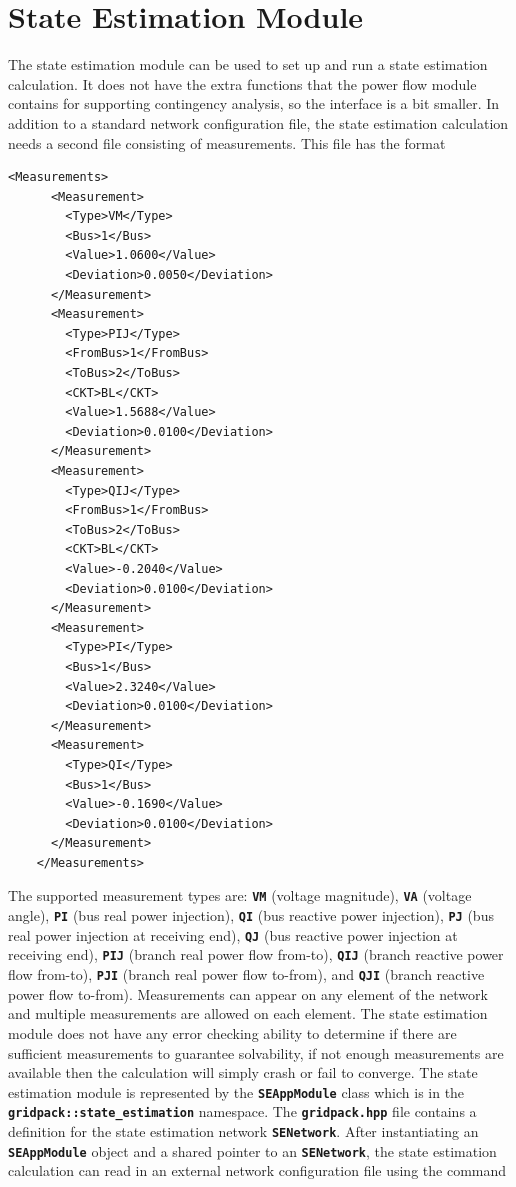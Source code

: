 \section{State Estimation Module}

The state estimation module can be used to set up and run a state estimation calculation. It does not have the extra functions that the power flow module contains for supporting contingency analysis, so the interface is a bit smaller. In addition to a standard network configuration file, the state estimation calculation needs a second file consisting of measurements. This file has the format

{
\color{blue}
\begin{Verbatim}[fontseries=b]
    <Measurements>
      <Measurement>
        <Type>VM</Type>
        <Bus>1</Bus>
        <Value>1.0600</Value>
        <Deviation>0.0050</Deviation>
      </Measurement>
      <Measurement>
        <Type>PIJ</Type>
        <FromBus>1</FromBus>
        <ToBus>2</ToBus>
        <CKT>BL</CKT>
        <Value>1.5688</Value>
        <Deviation>0.0100</Deviation>
      </Measurement>
      <Measurement>
        <Type>QIJ</Type>
        <FromBus>1</FromBus>
        <ToBus>2</ToBus>
        <CKT>BL</CKT>
        <Value>-0.2040</Value>
        <Deviation>0.0100</Deviation>
      </Measurement>
      <Measurement>
        <Type>PI</Type>
        <Bus>1</Bus>
        <Value>2.3240</Value>
        <Deviation>0.0100</Deviation>
      </Measurement>
      <Measurement>
        <Type>QI</Type>
        <Bus>1</Bus>
        <Value>-0.1690</Value>
        <Deviation>0.0100</Deviation>
      </Measurement>
    </Measurements>
\end{Verbatim}
}

The supported measurement types are: \texttt{\textbf{VM}} (voltage magnitude), \texttt{\textbf{VA}} (voltage angle), \texttt{\textbf{PI}} (bus real power injection), \texttt{\textbf{QI}} (bus reactive power injection), \texttt{\textbf{PJ}} (bus real power injection at receiving end), \texttt{\textbf{QJ}} (bus reactive power injection at receiving end), \texttt{\textbf{PIJ}} (branch real power flow from-to), \texttt{\textbf{QIJ}} (branch reactive power flow from-to), \texttt{\textbf{PJI}} (branch real power flow to-from), and \texttt{\textbf{QJI}} (branch reactive power flow to-from). Measurements can appear on any element of the network and multiple measurements are allowed on each element. The state estimation module does not have any error checking ability to determine if there are sufficient measurements to guarantee solvability, if not enough measurements are available then the calculation will simply crash or fail to converge.
The state estimation module is represented by the \texttt{\textbf{SEAppModule}} class which is in the \texttt{\textbf{gridpack::state\_estimation}} namespace. The \texttt{\textbf{gridpack.hpp}} file contains a definition for the state estimation network \texttt{\textbf{SENetwork}}. After instantiating an \texttt{\textbf{SEAppModule}} object and a shared pointer to an \texttt{\textbf{SENetwork}}, the state estimation calculation can read in an external network configuration file using the command

